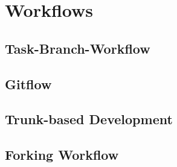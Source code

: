 
\section{Workflows}


\subsection{Task-Branch-Workflow}

\lipsum[1]




\subsection{Gitflow}

\lipsum[2]




\subsection{Trunk-based Development}

\lipsum[3]




\subsection{Forking Workflow}

\lipsum[4]

